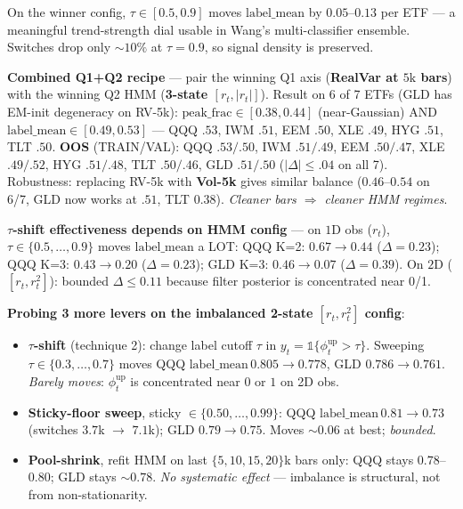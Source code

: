 \documentclass[11pt]{article}
\begin{document}
\smallskip
On the winner config, $\tau\in[0.5, 0.9]$ moves $\mathrm{label\_mean}$ by $0.05$--$0.13$ per ETF --- a meaningful trend-strength dial usable in Wang's multi-classifier ensemble. Switches drop only ${\sim}10\%$ at $\tau=0.9$, so signal density is preserved.

\smallskip
\textbf{Combined Q1+Q2 recipe} --- pair the winning Q1 axis (\textbf{RealVar at $5\mathrm{k}$ bars}) with the winning Q2 HMM (\textbf{3-state $[r_t,|r_t|]$}). Result on 6 of 7 ETFs (GLD has EM-init degeneracy on RV-5k): $\mathrm{peak\_frac}\in[0.38, 0.44]$ (near-Gaussian) AND $\mathrm{label\_mean}\in[0.49, 0.53]$ --- QQQ $.53$, IWM $.51$, EEM $.50$, XLE $.49$, HYG $.51$, TLT $.50$. \textbf{OOS} (TRAIN/VAL): QQQ $.53/.50$, IWM $.51/.49$, EEM $.50/.47$, XLE $.49/.52$, HYG $.51/.48$, TLT $.50/.46$, GLD $.51/.50$ ($|\Delta|\le.04$ on all 7). Robustness: replacing RV-5k with \textbf{Vol-5k} gives similar balance ($0.46$--$0.54$ on 6/7, GLD now works at $.51$, TLT $0.38$). \emph{Cleaner bars $\Rightarrow$ cleaner HMM regimes}.


\textbf{$\tau$-shift effectiveness depends on HMM config} --- on $1$D obs ($r_t$), $\tau\in\{0.5,\dots,0.9\}$ moves $\mathrm{label\_mean}$ a LOT: QQQ K=2: $0.67\to 0.44$ ($\Delta{=}0.23$); QQQ K=3: $0.43\to 0.20$ ($\Delta{=}0.23$); GLD K=3: $0.46\to 0.07$ ($\Delta{=}0.39$). On $2$D ($[r_t,r_t^2]$): bounded $\Delta\le 0.11$ because filter posterior is concentrated near 0/1.

\smallskip
\textbf{Probing 3 more levers on the imbalanced 2-state $[r_t,r_t^2]$ config}:
\begin{itemize}
\item \textbf{$\tau$-shift} (technique 2): change label cutoff $\tau$ in $y_t = \mathbb{1}\{\phi_t^{\mathrm{up}} > \tau\}$. Sweeping $\tau\in\{0.3,\dots,0.7\}$ moves QQQ $\mathrm{label\_mean}\,0.805\to 0.778$, GLD $0.786\to 0.761$. \emph{Barely moves}: $\phi_t^{\mathrm{up}}$ is concentrated near $0$ or $1$ on 2D obs.
\item \textbf{Sticky-floor sweep}, sticky $\in\{0.50,\dots,0.99\}$: QQQ $\mathrm{label\_mean}\,0.81\to 0.73$ (switches $3.7$k $\to$ $7.1$k); GLD $0.79\to 0.75$. Moves $\sim 0.06$ at best; \emph{bounded}.
\item \textbf{Pool-shrink}, refit HMM on last $\{5,10,15,20\}$k bars only: QQQ stays $0.78$--$0.80$; GLD stays $\sim 0.78$. \emph{No systematic effect} --- imbalance is structural, not from non-stationarity.
\end{itemize}
\end{document}

